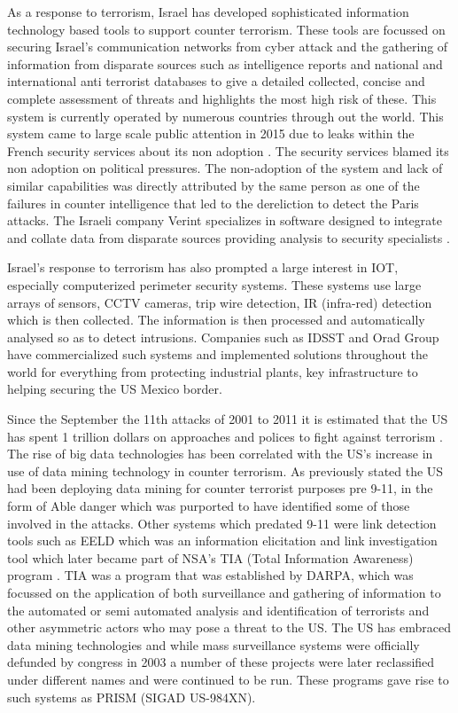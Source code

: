 As a response to terrorism, Israel has developed sophisticated information technology based tools to support counter terrorism. These tools are focussed on securing Israel's communication networks from cyber attack and the gathering of information from disparate sources such as intelligence reports and national and international anti terrorist databases to give a detailed collected, concise and complete assessment of threats and highlights the most high risk of these. This system is currently operated by numerous countries through out the world. This system came to large scale public attention in 2015 due to leaks within the French security services about its non adoption \citep{Israelcounterterrorismlessonfrance}. 
The security services blamed its non adoption on political pressures. The non-adoption of the system and lack of similar capabilities was directly attributed by the same person as one of the failures in counter intelligence that led to the dereliction to detect the Paris attacks. The Israeli company Verint specializes in software designed to integrate and collate data from disparate sources  providing analysis to security specialists \citep{zureik2010surveillance}.

Israel's response to terrorism has also prompted a large interest in IOT, especially  computerized perimeter security systems. These systems use large arrays of sensors, CCTV cameras, trip wire detection, IR (infra-red) detection which is then collected. The information is then processed and automatically analysed so as to detect intrusions. Companies such as IDSST and Orad Group \citep{gordon2011israel} have commercialized such systems and implemented solutions throughout the world for everything from  protecting industrial plants, key infrastructure to helping securing the US Mexico border.

Since the September the 11th attacks of 2001 to 2011 it is estimated that the US has  spent 1 trillion dollars on approaches and polices to fight against terrorism \citep{roche2015intelligence}. The rise of big data technologies has been correlated with the US's increase in use of data mining technology in counter terrorism. As previously stated the US had been deploying data mining for counter terrorist purposes pre 9-11, in the form of Able danger which was purported to have identified some of those involved  in the attacks. Other systems which predated 9-11 were link detection tools such as EELD \citep{mooney2002relational} which was an information elicitation and link investigation tool which later became part of NSA's TIA (Total Information Awareness) program \citep{deibel2016nsa}. TIA was a program that was established by DARPA, which was focussed on the application of both surveillance and gathering of information to the automated or semi automated analysis and identification of terrorists and other asymmetric actors who may pose a threat to the US. The US has embraced data mining technologies and while mass surveillance systems were officially defunded by congress in 2003 a number of these projects were later reclassified under different names and were continued to be run. These programs gave rise to such systems as PRISM (SIGAD US-984XN). 

